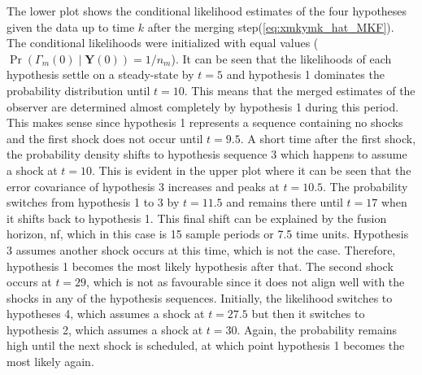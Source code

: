 The lower plot shows the conditional likelihood estimates of the four hypotheses given the data up to time $k$ after the merging step(\ref{eq:xmkymk_hat_MKF}). The conditional likelihoods were initialized with equal values ($\operatorname{Pr}\left(\Gamma_m(0) \mid \mathbf{Y}(0)\right)=1/n_m$). It can be seen that the likelihoods of each hypothesis settle on a steady-state by $t=5$ and hypothesis 1 dominates the probability distribution until $t=10$. This means that the merged estimates of the observer are determined almost completely by hypothesis 1 during this period. This makes sense since hypothesis 1 represents a sequence containing no shocks and the first shock does not occur until $t=9.5$. A short time after the first shock, the probability density shifts to hypothesis sequence 3 which happens to assume a shock at $t=10$. This is evident in the upper plot where it can be seen that the error covariance of hypothesis 3 increases and peaks at $t=10.5$. The probability switches from hypothesis 1 to 3 by $t=11.5$ and remains there until $t=17$ when it shifts back to hypothesis 1. This final shift can be explained by the fusion horizon, \gls{nf}, which in this case is 15 sample periods or 7.5 time units. Hypothesis 3 assumes another shock occurs at this time, which is not the case. Therefore, hypothesis 1 becomes the most likely hypothesis after that. The second shock occurs at $t=29$, which is not as favourable since it does not align well with the shocks in any of the hypothesis sequences. Initially, the likelihood switches to hypotheses 4, which assumes a shock at $t=27.5$ but then it switches to hypothesis 2, which assumes a shock at $t=30$. Again, the probability remains high until the next shock is scheduled, at which point hypothesis 1 becomes the most likely again.

